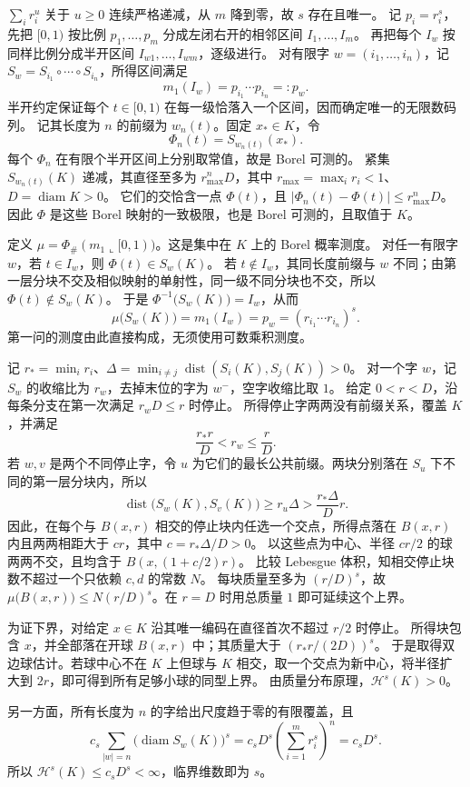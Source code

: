 \begin{solution}
\(\sum_i r_i^u\) 关于 \(u\ge0\) 连续严格递减，从 \(m\) 降到零，故 \(s\) 存在且唯一。
记 \(p_i=r_i^s\)，先把 \([0,1)\) 按比例 \(p_1,\ldots,p_m\) 分成左闭右开的相邻区间 \(I_1,\ldots,I_m\)。
再把每个 \(I_w\) 按同样比例分成半开区间 \(I_{w1},\ldots,I_{wm}\)，逐级进行。
对有限字 \(w=(i_1,\ldots,i_n)\)，记 \(S_w=S_{i_1}\circ\cdots\circ S_{i_n}\)，所得区间满足
\[
 m_1(I_w)=p_{i_1}\cdots p_{i_n}=:p_w.
\]
半开约定保证每个 \(t\in[0,1)\) 在每一级恰落入一个区间，因而确定唯一的无限数码列。
记其长度为 \(n\) 的前缀为 \(w_n(t)\)。固定 \(x_*\in K\)，令
\[
 \Phi_n(t)=S_{w_n(t)}(x_*).
\]
每个 \(\Phi_n\) 在有限个半开区间上分别取常值，故是 Borel 可测的。
紧集 \(S_{w_n(t)}(K)\) 递减，其直径至多为 \(r_{\max}^nD\)，其中 \(r_{\max}=\max_i r_i<1\)、\(D=\operatorname{diam}K>0\)。
它们的交恰含一点 \(\Phi(t)\)，且 \(|\Phi_n(t)-\Phi(t)|\le r_{\max}^nD\)。
因此 \(\Phi\) 是这些 Borel 映射的一致极限，也是 Borel 可测的，且取值于 \(K\)。

定义 \(\mu=\Phi_\#(m_1\llcorner[0,1))\)。这是集中在 \(K\) 上的 Borel 概率测度。
对任一有限字 \(w\)，若 \(t\in I_w\)，则 \(\Phi(t)\in S_w(K)\)。
若 \(t\notin I_w\)，其同长度前缀与 \(w\) 不同；由第一层分块不交及相似映射的单射性，同一级不同分块也不交，所以 \(\Phi(t)\notin S_w(K)\)。
于是 \(\Phi^{-1}\bigl(S_w(K)\bigr)=I_w\)，从而
\[
 \mu\bigl(S_w(K)\bigr)=m_1(I_w)=p_w=(r_{i_1}\cdots r_{i_n})^s.
\]
第一问的测度由此直接构成，无须使用可数乘积测度。

记 \(r_*=\min_i r_i\)、\(\Delta=\min_{i\ne j}\operatorname{dist}(S_i(K),S_j(K))>0\)。
对一个字 \(w\)，记 \(S_w\) 的收缩比为 \(r_w\)，去掉末位的字为 \(w^-\)，空字收缩比取 \(1\)。
给定 \(0<r<D\)，沿每条分支在第一次满足 \(r_wD\le r\) 时停止。
所得停止字两两没有前缀关系，覆盖 \(K\)，并满足
\[
 \frac{r_*r}{D}<r_w\le\frac rD.
\]
若 \(w,v\) 是两个不同停止字，令 \(u\) 为它们的最长公共前缀。两块分别落在 \(S_u\) 下不同的第一层分块内，所以
\[
 \operatorname{dist}\bigl(S_w(K),S_v(K)\bigr)
 \ge r_u\Delta>\frac{r_*\Delta}{D}r.
\]
因此，在每个与 \(B(x,r)\) 相交的停止块内任选一个交点，所得点落在 \(B(x,r)\) 内且两两相距大于 \(cr\)，其中 \(c=r_*\Delta/D>0\)。
以这些点为中心、半径 \(cr/2\) 的球两两不交，且均含于 \(B(x,(1+c/2)r)\)。
比较 Lebesgue 体积，知相交停止块数不超过一个只依赖 \(c,d\) 的常数 \(N\)。
每块质量至多为 \((r/D)^s\)，故 \(\mu\bigl(B(x,r)\bigr)\le N(r/D)^s\)。在 \(r=D\) 时用总质量 \(1\) 即可延续这个上界。

为证下界，对给定 \(x\in K\) 沿其唯一编码在直径首次不超过 \(r/2\) 时停止。
所得块包含 \(x\)，并全部落在开球 \(B(x,r)\) 中；其质量大于 \((r_*r/(2D))^s\)。
于是取得双边球估计。若球中心不在 \(K\) 上但球与 \(K\) 相交，取一个交点为新中心，将半径扩大到 \(2r\)，即可得到所有足够小球的同型上界。
由质量分布原理，\(\mathcal H^s(K)>0\)。

另一方面，所有长度为 \(n\) 的字给出尺度趋于零的有限覆盖，且
\[
 c_s\sum_{|w|=n}\bigl(\operatorname{diam}S_w(K)\bigr)^s
 =c_sD^s\left(\sum_{i=1}^mr_i^s\right)^n=c_sD^s.
\]
所以 \(\mathcal H^s(K)\le c_sD^s<\infty\)，临界维数即为 \(s\)。
\end{solution}

